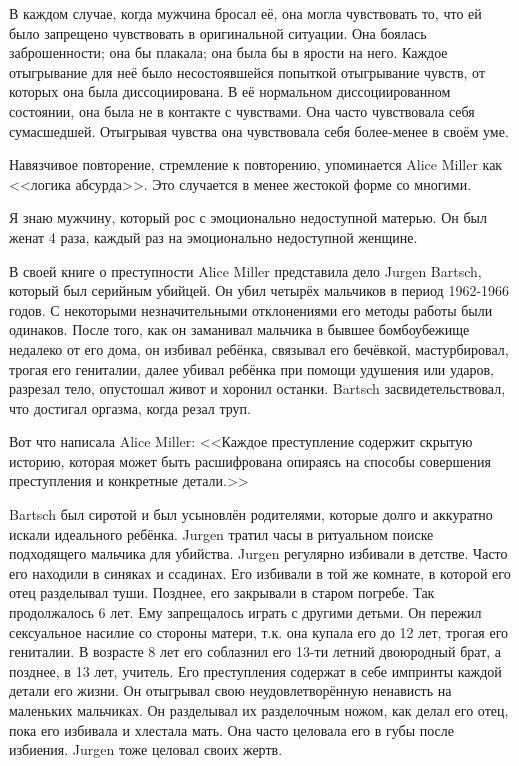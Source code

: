 \documentclass[10pt, fleqn]{article}
\begin{document}
В каждом случае, когда мужчина бросал её, она могла чувствовать то, что ей было запрещено чувствовать в оригинальной ситуации. Она боялась заброшенности; она бы плакала; она была бы в ярости на него. Каждое отыгрывание для неё было несостоявшейся попыткой отыгрывание чувств, от которых она была диссоциирована. В её нормальном диссоциированном состоянии, она была не в контакте с чувствами. Она часто чувствовала себя сумасшедшей. Отыгрывая чувства она чувствовала себя более-менее в своём уме.

Навязчивое повторение, стремление к повторению, упоминается Alice Miller как <<логика абсурда>>. Это случается в менее жестокой форме со многими.

Я знаю мужчину, который рос с эмоционально недоступной матерью. Он был женат 4 раза, каждый раз на эмоционально недоступной женщине.


В своей книге о преступности Alice Miller представила дело Jurgen Bartsch, который был серийным убийцей. Он убил четырёх мальчиков в период 1962-1966 годов. С некоторыми незначительными отклонениями его методы работы были одинаков. После того, как он заманивал мальчика в бывшее бомбоубежище недалеко от его дома, он избивал ребёнка, связывал его бечёвкой, мастурбировал, трогая его гениталии, далее убивал ребёнка при помощи удушения или ударов, разрезал тело, опустошал живот и хоронил останки. Bartsch засвидетельствовал, что достигал оргазма, когда резал труп.

Вот что написала Alice Miller: <<Каждое преступление содержит скрытую историю, которая может быть расшифрована опираясь на способы совершения преступления и конкретные детали.>>

Bartsch был сиротой и был усыновлён родителями, которые долго и аккуратно искали идеального ребёнка. Jurgen тратил часы в ритуальном поиске подходящего мальчика для убийства. Jurgen регулярно избивали в детстве. Часто его находили в синяках и ссадинах. Его избивали в той же комнате, в которой его отец разделывал туши. Позднее, его закрывали в старом погребе. Так продолжалось 6 лет. Ему запрещалось играть с другими детьми. Он пережил сексуальное насилие со стороны матери, т.к. она купала его до 12 лет, трогая его гениталии. В возрасте 8 лет его соблазнил его 13-ти летний
двоюродный брат, а позднее, в 13 лет, учитель. Его преступления содержат в себе импринты каждой детали его жизни. Он отыгрывал свою неудовлетворённую ненависть на маленьких мальчиках. Он разделывал их разделочным ножом, как делал его отец, пока его избивала и хлестала мать. Она часто целовала его в губы после избиения. Jurgen тоже целовал своих жертв.
\end{document}
